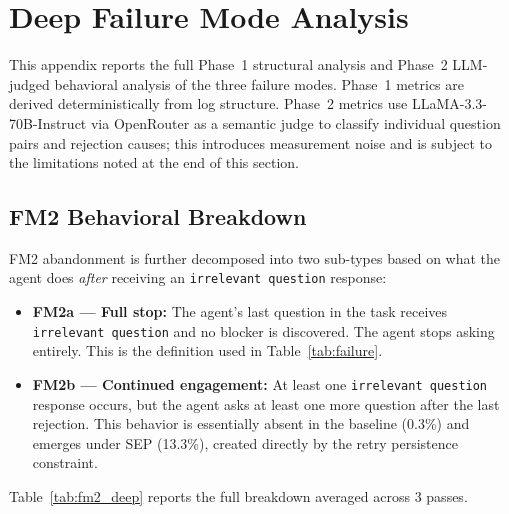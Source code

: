 \documentclass{article} %
\newcommand{\oursystem}{SEP} %
\begin{document}
\section{Deep Failure Mode Analysis}
\label{app:fm_deep}

This appendix reports the full Phase~1 structural analysis and Phase~2 LLM-judged
behavioral analysis of the three failure modes.
Phase~1 metrics are derived deterministically from log structure.
Phase~2 metrics use LLaMA-3.3-70B-Instruct via OpenRouter as a semantic judge to
classify individual question pairs and rejection causes; this introduces measurement
noise and is subject to the limitations noted at the end of this section.

\subsection{FM2 Behavioral Breakdown}

FM2 abandonment is further decomposed into two sub-types based on what the agent does
\emph{after} receiving an \texttt{irrelevant question} response:

\begin{itemize}[nosep, leftmargin=1.5em]
  \item \textbf{FM2a --- Full stop:} The agent's last question in the task receives
    \texttt{irrelevant question} and no blocker is discovered. The agent stops
    asking entirely. This is the definition used in Table~\ref{tab:failure}.
  \item \textbf{FM2b --- Continued engagement:} At least one \texttt{irrelevant question}
    response occurs, but the agent asks at least one more question after the last rejection.
    This behavior is essentially absent in the baseline (0.3\%) and emerges under
    \oursystem{} (13.3\%), created directly by the retry persistence constraint.
\end{itemize}

Table~\ref{tab:fm2_deep} reports the full breakdown averaged across 3 passes.
\end{document}
